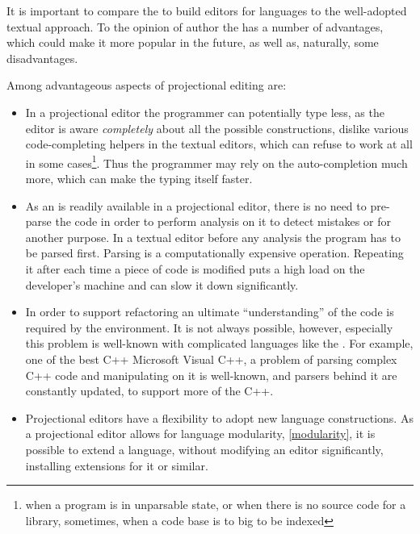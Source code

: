 



  It is important to compare the  to build editors for languages to the well-adopted 
  textual approach. To the opinion of author the  has a number of advantages, 
  which could make it more popular in the future, as well as, naturally, some disadvantages.
  
  Among advantageous aspects of projectional editing are:
  
  \begin{itemize}
   \item In a projectional editor the programmer can potentially type less, as the editor is aware \emph{completely}
  about all the possible constructions, dislike various code-completing helpers in the textual editors, which can refuse 
  to work at all in some cases\footnote{when a program is in unparsable state, or when there is no source code for a library,
  sometimes, when a code base is to big to be indexed}. Thus the programmer may rely on the auto-completion much more, which
  can make the typing itself faster.

  
  \item As an  is readily available  in a projectional editor, there is no need to pre-parse the code in order to 
  perform analysis on it to detect mistakes or for another purpose. In a textual editor before any analysis the program has to be 
  parsed first. Parsing is a computationally expensive operation. Repeating it after each time a piece of code is modified 
  puts a high load on the developer's machine and can slow it down significantly. 
  
  \item In order to support refactoring an ultimate ``understanding'' of the code is required by the environment. 
  It is not always possible, however, especially this problem is well-known with complicated languages like the \cpppl.
  For example, one of the best C++  Microsoft Visual C++, a problem of parsing complex C++ code and manipulating 
  on it is well-known, and parsers behind it are constantly updated, to support more of the C++.
    
  
  \item Projectional editors have a flexibility to adopt new language constructions. 
  As a projectional editor allows for language modularity, \ref{modularity}, it is possible to extend a language, 
  without modifying an editor significantly, installing extensions for it or similar.
  

\end{itemize}
